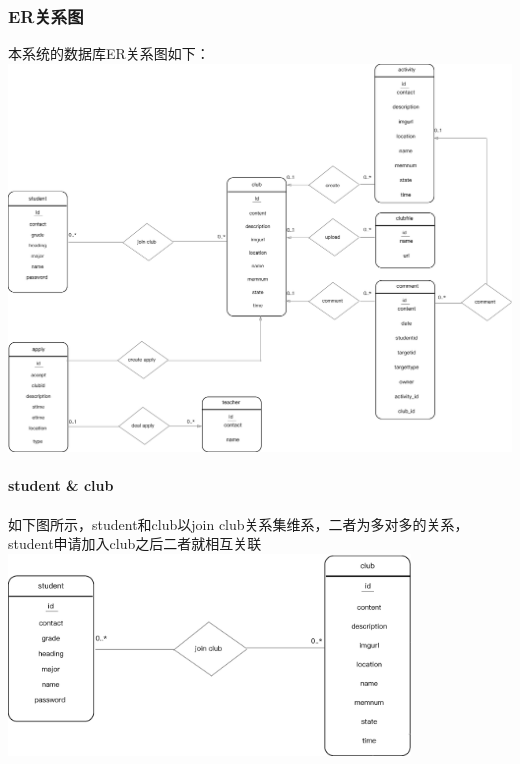 \documentclass[UTF8]{ctexart}
\begin{document}
\subsubsection{ER关系图}
本系统的数据库ER关系图如下：
\newline
\includegraphics[width = 1.0\textwidth]{er.eps}
\paragraph{student \& club}
如下图所示，student和club以join club关系集维系，二者为多对多的关系，student申请加入club之后二者就相互关联
\newline
\includegraphics[width = 0.8\textwidth]{student-club-er.eps}
\end{document}
